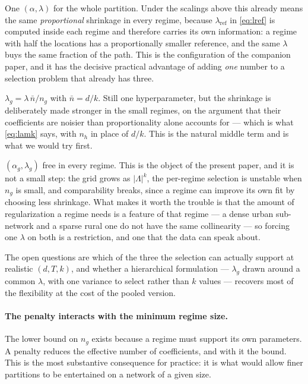 \documentclass[11pt,a4paper]{article}
\begin{document}
\begin{description}[leftmargin=1.2em,itemsep=3pt,topsep=3pt]
  \item[\textbf{Pooled.}] One $(\alpha,\lambda)$ for the whole partition. Under
    the scalings above this already means the same \emph{proportional}
    shrinkage in every regime, because $\lambda_{\mathrm{ref}}$ in
    \eqref{eq:lref} is computed inside each regime and therefore carries its own
    information: a regime with half the locations has a proportionally smaller
    reference, and the same $\lambda$ buys the same fraction of the path. This
    is the configuration of the companion paper, and it has the decisive
    practical advantage of adding \emph{one} number to a selection problem that
    already has three.
  \item[\textbf{Size-scaled.}] $\lambda_g = \lambda\,\bar n / n_g$ with
    $\bar n = d/k$. Still one hyperparameter, but the shrinkage is deliberately
    made stronger in the small regimes, on the argument that their coefficients
    are noisier than proportionality alone accounts for --- which is what
    \eqref{eq:lamk} says, with $n_h$ in place of $d/k$. This is the natural
    middle term and is what we would try first.
  \item[\textbf{Cluster-specific.}] $(\alpha_g,\lambda_g)$ free in every regime.
    This is the object of the present paper, and it is not a small step: the
    grid grows as $|\Lambda|^k$, the per-regime selection is unstable when
    $n_g$ is small, and comparability breaks, since a regime can improve its
    own fit by choosing less shrinkage. What makes it worth the trouble is that
    the amount of regularization a regime needs is a feature of that regime ---
    a dense urban sub-network and a sparse rural one do not have the same
    collinearity --- so forcing one $\lambda$ on both is a restriction, and one
    that the data can speak about.
\end{description}

The open questions are which of the three the selection can actually support at
realistic $(d, T, k)$, and whether a hierarchical formulation --- $\lambda_g$
drawn around a common $\lambda$, with one variance to select rather than $k$
values --- recovers most of the flexibility at the cost of the pooled version.

\paragraph{The penalty interacts with the minimum regime size.} The lower bound
on $n_g$ exists because a regime must support its own parameters. A penalty
reduces the effective number of coefficients, and with it the bound. This is the
most substantive consequence for practice: it is what would allow finer
partitions to be entertained on a network of a given size.
\end{document}
